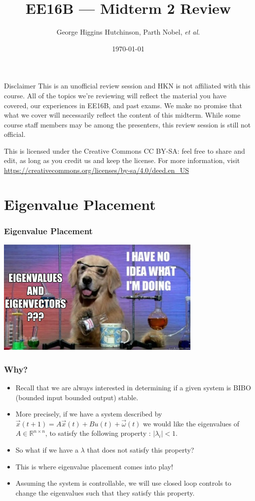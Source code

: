 \documentclass{beamer}
\title{EE16B --- Midterm 2 Review}
\author{George Higgins Hutchinson, Parth Nobel, \textit{et al.}}
\date{\today}
\newcommand{\R}{\mathbb{R}}
\begin{document}
	\begin{frame}
		\titlepage
	\end{frame}

	\begin{frame}{Disclaimer}
	This is an unofficial review session and HKN is not affiliated with this course. All of the topics we're reviewing will reflect the material you have covered, our experiences in EE16B, and past exams. We make no promise that what we cover will necessarily reflect the content of this midterm. While some course staff members may be among the presenters, this review session is still not official.
	\vspace{1em}
	
	This is licensed under the Creative Commons CC BY-SA: feel free to share and edit, as long as you credit us and keep the license. For more information, visit \\ \small{\url{https://creativecommons.org/licenses/by-sa/4.0/deed.en_US}}
	
	\end{frame}

	\section{Eigenvalue Placement}

	\begin{frame}
	\frametitle{Eigenvalue Placement} 
	\centering\includegraphics[width = 10cm]{eigenvalue.jpg}
\end{frame}

\begin{frame}
\frametitle{Why?} 
\begin{itemize}
\item Recall that we are always interested in determining if a given system is BIBO (bounded input bounded output) stable. 
\item More precisely, if we have a system described by $\vec{x}(t+1) = A\vec{x}(t) + Bu(t) + \vec{\omega}(t)$ we would like the eigenvalues of $A \in \R^{n \times n}$, to satisfy the following property : $|\lambda_i| < 1$. 
\item So what if we have a $\lambda$ that does not satisfy this property?
\item This is where eigenvalue placement comes into play!
\item Assuming the system is controllable, we will use closed loop controls to change the eigenvalues such that they satisfy this property. 
\end{itemize}
\end{frame}
\end{document}
